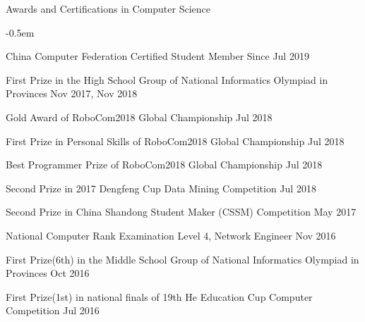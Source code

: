 \documentclass{resume} %
\begin{document}
\begin{rSection}{Awards and Certifications in Computer Science}
    \begin{list}{}{
        \setlength{\leftmargin}{0.0em}
        \itemsep -0.5em
      }

    
    \item China Computer Federation Certified Student Member \hfill Since Jul 2019

    \item First Prize in the High School Group of National Informatics Olympiad in Provinces \hfill Nov 2017, Nov 2018
    \item Gold Award of RoboCom2018 Global Championship \hfill Jul 2018
    \item First Prize in Personal Skills of RoboCom2018 Global Championship \hfill Jul 2018
    \item Best Programmer Prize of RoboCom2018 Global Championship \hfill Jul 2018
    \item Second Prize in 2017 Dengfeng Cup Data Mining Competition \hfill Jul 2018
    \item Second Prize in China Shandong Student Maker (CSSM) Competition \hfill May 2017
    \item National Computer Rank Examination Level 4, Network Engineer \hfill Nov 2016
    \item First Prize(6th) in the Middle School Group of National Informatics Olympiad in Provinces \hfill Oct 2016
    \item First Prize(1st) in national finals of 19th He Education Cup Computer Competition \hfill Jul 2016
    
    \end{list}
\end{rSection}
\end{document}
